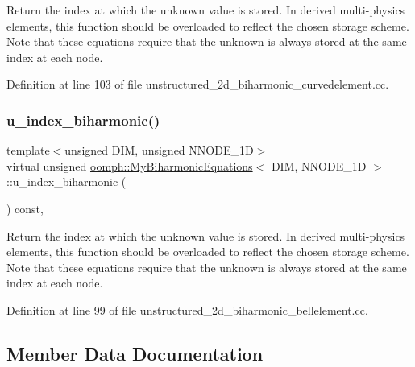 Return the index at which the unknown value is stored. In derived multi-\/physics elements, this function should be overloaded to reflect the chosen storage scheme. Note that these equations require that the unknown is always stored at the same index at each node. 



Definition at line 103 of file unstructured\+\_\+2d\+\_\+biharmonic\+\_\+curvedelement.\+cc.

\mbox{\label{classoomph_1_1MyBiharmonicEquations_aecad5ed2e1534519b81e778c5dff6457}} 
\subsubsection{\texorpdfstring{u\+\_\+index\+\_\+biharmonic()}{u\_index\_biharmonic()}}
{\footnotesize\ttfamily template$<$unsigned D\+IM, unsigned N\+N\+O\+D\+E\+\_\+1D$>$ \\
virtual unsigned \hyperlink{classoomph_1_1MyBiharmonicEquations}{oomph\+::\+My\+Biharmonic\+Equations}$<$ D\+IM, N\+N\+O\+D\+E\+\_\+1D $>$\+::u\+\_\+index\+\_\+biharmonic (\begin{DoxyParamCaption}{ }\end{DoxyParamCaption}) const\hspace{0.3cm}{\ttfamily [inline]}, {\ttfamily [virtual]}}



Return the index at which the unknown value is stored. In derived multi-\/physics elements, this function should be overloaded to reflect the chosen storage scheme. Note that these equations require that the unknown is always stored at the same index at each node. 



Definition at line 99 of file unstructured\+\_\+2d\+\_\+biharmonic\+\_\+bellelement.\+cc.



\subsection{Member Data Documentation}
\mbox{\label{classoomph_1_1MyBiharmonicEquations_abaac7831443ec4aaa927753f607a79a1}} 
